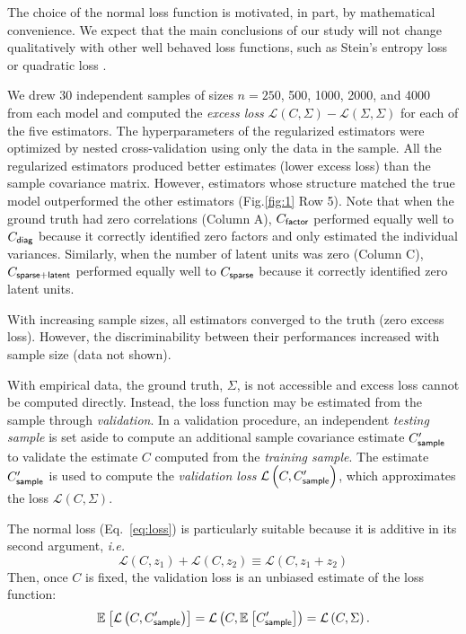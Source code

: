 \documentclass[10pt]{article}
\newcommand{\figref}[2]{Fig.\;\ref{fig:#1}\,#2}
\newcommand{\loss}[1]{\mathcal L\left(#1\right)}
\newcommand{\E}[2][]{\mathbb E_{#1}\left[ #2\right]}    %
\newcommand{\ie}{\emph{i.e.}\;}
\begin{document}
The choice of the normal loss function is motivated, in part, by mathematical convenience. We expect that the main conclusions of our study will not change qualitatively with other well behaved loss functions, such as Stein's entropy loss or quadratic loss \cite{James:1961, Fan:2008, Ledoit:2004, Schafer:2005}.  

We drew 30 independent samples of sizes $n=250$, 500, 1000, 2000, and 4000 from each model and computed the \emph{excess loss} $\loss{C,\Sigma}-\loss{\Sigma,\Sigma}$ for each of the five estimators.  The hyperparameters of the regularized estimators were optimized by nested cross-validation using only the data in the sample.  All the regularized estimators produced better estimates (lower excess loss) than the sample covariance matrix.  However, estimators whose structure matched the true model outperformed the other estimators (\figref{1}{\,Row 5}).  Note that when the ground truth had zero correlations (Column A), $C_{\sf factor}$ performed equally well to $C_{\sf diag}$ because it correctly identified zero factors and only estimated the individual variances. Similarly, when the number of latent units was zero (Column C), $C_{\sf sparse+latent}$ performed equally well to $C_{\sf sparse}$ because it correctly identified zero latent units. 

With increasing sample sizes, all estimators converged to the truth (zero excess loss).  However, 
the discriminability between their performances increased with sample size (data not shown).

With empirical data, the ground truth, $\Sigma$, is not accessible and excess loss cannot be computed directly. Instead, the loss function may be estimated from the sample through \emph{validation}.  In a validation procedure, an independent \emph{testing sample} is set aside to compute an additional sample covariance estimate $C_{\sf sample}^\prime$ to validate the estimate $C$ computed from the  \emph{training sample}.   The estimate $C_{\sf sample}^\prime$ is used to compute the \emph{validation loss} $\loss{C,C_{\sf sample}^\prime}$, which approximates the loss  $\loss{C,\Sigma}$.

The normal loss (Eq.~\ref{eq:loss}) is particularly suitable because it is additive in its second argument, \ie
\begin{equation*}\label{eq:additivity}
    \loss{C,z_1} + \loss{C,z_2} \equiv \loss{C,z_1+z_2}
\end{equation*}
Then, once $C$ is fixed, the validation loss is an unbiased estimate of the loss function:
\begin{equation*}
    \E{\loss{C,C_{\sf sample}^\prime}}=\loss{C,\E{C_{\sf sample}^\prime}}=\loss{C,\Sigma}.
\end{equation*}
\end{document}

